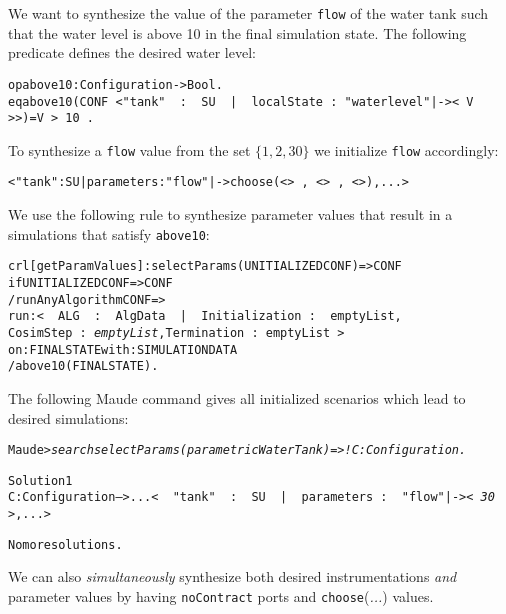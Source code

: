\begin{example}\label{ex:dse}
We want to synthesize the value of  the parameter \texttt{flow} of
the water tank  such that the water level is above 10 in the final
simulation state. The following  predicate defines the desired water level:

\small
\begin{alltt}
op above10 : Configuration -> Bool .
eq above10(CONF\,< "tank"\,\,:\,\,SU\,\,|\,\,localState\,:\,"waterlevel" |-> <\,V\,> >) = V\,>\,10\,.  
\end{alltt}
\normalsize

\noindent  To synthesize a  \texttt{flow} value from the set
$\{1, 2,30\}$ we initialize \texttt{flow} accordingly:

\small
\begin{alltt}
< "tank" : SU | parameters : "flow" |-> choose(<\;>\,,\,<\;>\,,\,<\;>), ... >
\end{alltt}
\normalsize

We use the following rule to synthesize parameter values that result
in a simulations that satisfy \texttt{above10}:

\small
\begin{alltt}
crl [getParamValues] : selectParams(UNITIALIZEDCONF) => CONF 
  if UNITIALIZEDCONF => CONF
  / runAnyAlgorithm CONF => 
       run: <\,\,ALG\,\,:\,\,AlgData\,\,|\,\,Initialization\,:\,\,emptyList, 
                            CosimStep\,:\,\emph{emptyList}, Termination\,:\,emptyList\,> 
       on: FINALSTATE with: SIMULATIONDATA
  / above10(FINALSTATE) .
\end{alltt}
\normalsize

\noindent  The following Maude command gives all initialized scenarios
which lead to desired simulations:  

\small
\begin{alltt}
Maude> \emph{search selectParams(parametricWaterTank) =>! C:Configuration .}

Solution 1
C:Configuration --> ... <\,\,"tank"\,\,:\,\,SU\,\,|\,\,parameters\,:\,\,"flow" |-> \emph{<\,30\,>}, ... >

No more solutions.
\end{alltt}
\normalsize
\end{example}

We
can also \emph{simultaneously} synthesize both desired
instrumentations \emph{and} 
parameter values by having \texttt{noContract} ports and
\texttt{choose}(\emph{...}) values.

